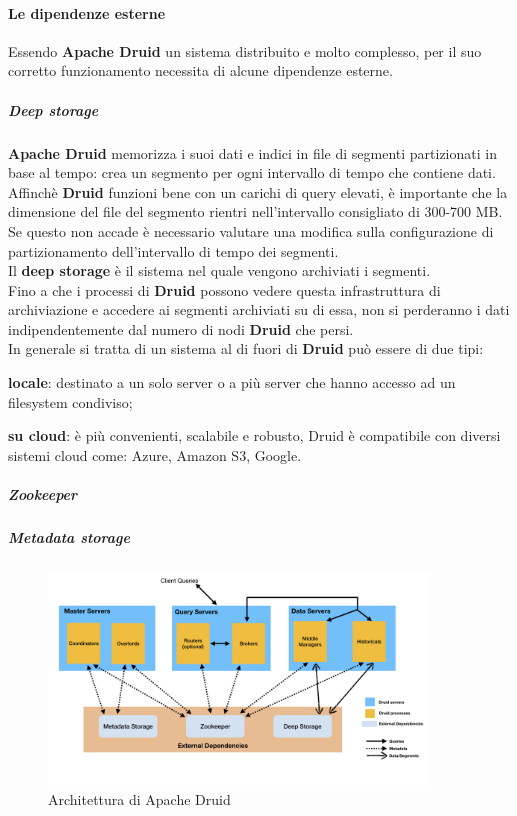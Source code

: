 \paragraph{Le dipendenze esterne}
Essendo \textbf{Apache Druid} un sistema distribuito e molto complesso, per il suo corretto funzionamento necessita di alcune dipendenze esterne.\\

\subparagraph{Deep storage}
\textbf{Apache Druid} memorizza i suoi dati e indici in file di segmenti partizionati in base al
tempo:  crea un segmento per ogni intervallo di tempo che contiene dati.\\
Affinchè \textbf{Druid} funzioni bene con un carichi di query elevati, è importante che la dimensione del file
del segmento rientri nell’intervallo consigliato di 300-700 MB. Se questo non accade è necessario valutare 
una modifica sulla configurazione di partizionamento dell’intervallo di tempo dei segmenti.\\
Il \textbf{deep storage} è il sistema nel quale vengono archiviati i segmenti.\\
Fino a che i processi di \textbf{Druid} possono vedere questa infrastruttura di archiviazione e accedere
ai segmenti archiviati su di essa, non si perderanno i dati indipendentemente dal numero
di nodi \textbf{Druid} che persi.\\
In generale si tratta di un sistema al di fuori di \textbf{Druid} può essere di due tipi:
\begin{list}{*}
\item 
\textbf{locale}: destinato a un solo server o a più server che hanno accesso ad un filesystem
condiviso;
\item \item \textbf{su cloud}: è più convenienti, scalabile e robusto, Druid è compatibile con diversi sistemi cloud come: Azure,
Amazon S3, Google.
\end{list}
\subparagraph{Zookeeper}
\subparagraph{Metadata storage}

\begin{figure}[h]   
    \centering
    \includegraphics[width=0.9\textwidth]{images/componenti/druid_architectcture.png}
    \caption{Architettura di Apache Druid}
    \label{fig:druid_architecture}
\end{figure}
